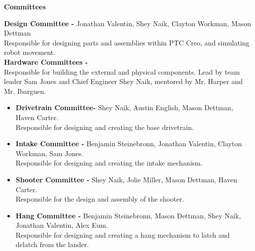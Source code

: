 \documentclass[
letterpaper, %
11pt, %
onecolumn, %
openany, %
]{article}
\begin{document}

% 
% 


 
% 
% 
% 




                                                     
                                                     

\clearpage 
\pagestyle{plain}
\noindent\textbf{\Huge Committees}
\newline

\noindent\textbf{\Large Design Committee -} Jonathan Valentin, Shey Naik, Clayton Workman, Mason Dettman \\ Responsible for designing parts and assemblies within PTC Creo, and simulating robot movement. \\
\newline\noindent\textbf{\Large Hardware Committees -}
\\ Responsible for building the external and physical components. Lead by team leader Sam Jones and Chief Engineer Shey Naik, mentored by Mr. Harper and Mr. Ibarguen.\\

\begin{itemize}

\item \textbf{Drivetrain Committee-} Shey Naik, Austin English, Mason Dettman, Haven Carter. \\ Responsible for designing and creating the base drivetrain.

\item \textbf{Intake Committee -} Benjamin Steinebronn, Jonathan Valentin, Clayton Workman, Sam Jones.  \\ Responsible for designing and creating the intake mechanism. 

\item \textbf{Shooter Committee -} Shey Naik, Jolie Miller, Mason Dettman, Haven Carter. \\Responsible for the design and assembly of the shooter. 

\item \textbf{Hang Committee -} Benjamin Steinebronn, Mason Dettman, Shey Naik, Jonathan Valentin, Alex Eum. \\  Responsible for designing and creating a hang mechanism to latch and delatch from the lander. 

\end{itemize} 
\end{document}
